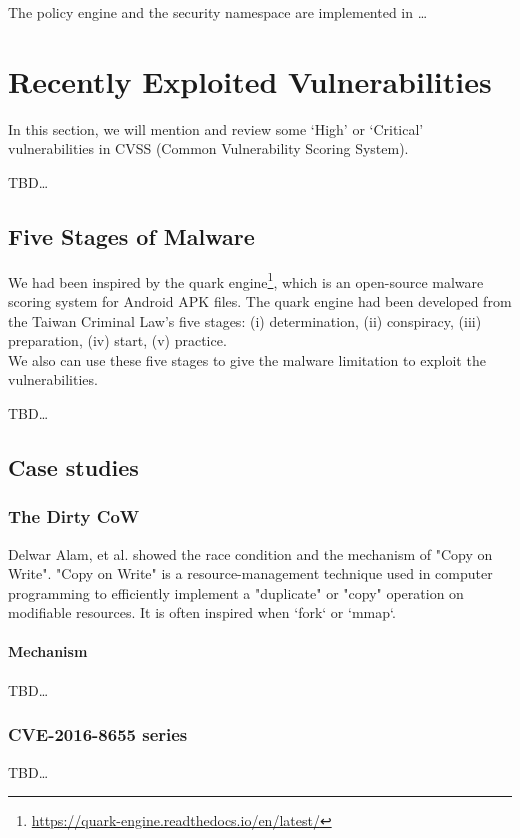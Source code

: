 The policy engine and the security namespace are implemented in \dots


\section{Recently Exploited Vulnerabilities}
In this section, we will mention and review some `High' or `Critical' vulnerabilities
in CVSS (Common Vulnerability Scoring System).

TBD\dots

\subsection{Five Stages of Malware}
We had been inspired by the quark engine\footnote{\url{https://quark-engine.readthedocs.io/en/latest/}},
which is an open-source malware scoring system for Android APK files. The quark
engine had been developed from the Taiwan Criminal Law's five stages:
(\Rn{1}) determination, (\Rn{2}) conspiracy, (\Rn{3}) preparation, (\Rn{4}) start, (\Rn{5}) practice.\\

We also can use these five stages to give the malware limitation to exploit the vulnerabilities.

TBD\dots

\subsection{Case studies}

\subsubsection{The Dirty CoW}
Delwar Alam, et al.\cite{8019988} showed the race condition and the mechanism of "Copy on
Write". "Copy on Write" is a resource-management technique used in computer programming
to efficiently implement a "duplicate" or "copy" operation on modifiable resources\cite{6394426}.
It is often inspired when ‘fork‘ or ‘mmap‘.

\paragraph{Mechanism}
TBD\dots

\subsubsection{CVE-2016-8655 series}
TBD\dots

